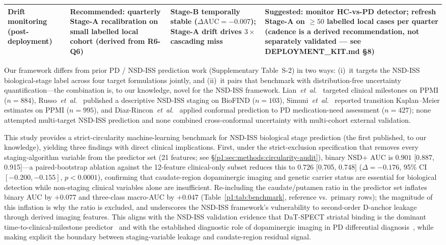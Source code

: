 \begin{table}[!t]
\begin{tabular}{@{}p{2.4cm}p{2.6cm}p{2.0cm}p{2.0cm}@{}}
\midrule
Drift monitoring (post-deployment) & Recommended: quarterly Stage-A recalibration on small labelled local cohort (derived from R6-Q6) & Stage-B temporally stable ($\Delta\mathrm{AUC} = -0.007$); Stage-A drift drives $3{\times}$ cascading miss & Suggested: monitor HC-vs-PD detector; refresh Stage-A on $\geq 50$ labelled local cases per quarter (cadence is a derived recommendation, not separately validated --- see DEPLOYMENT\_KIT.md §8) \\
\bottomrule
\end{tabular}
\end{table}

Our framework differs from prior PD / NSD-ISS prediction work (Supplementary Table~S-2) in two ways: (i)~it targets the NSD-ISS biological-stage label across four target formulations jointly, and (ii)~it pairs that benchmark with distribution-free uncertainty quantification---the combination is, to our knowledge, novel for the NSD-ISS framework. Lian~\textit{et~al.}~\cite{adamedgraph} targeted clinical milestones on PPMI ($n{=}884$), Russo~\textit{et~al.}~\cite{russo2025} published a descriptive NSD-ISS staging on BioFIND ($n{=}103$), Simuni~\textit{et~al.}~\cite{simuni2025} reported transition Kaplan--Meier estimates on PPMI ($n{=}995$), and Diaz-Rincon~\textit{et~al.}~\cite{diazrincon2025} applied conformal prediction to PD medication-need assessment ($n{=}427$); none attempted multi-target NSD-ISS prediction and none combined cross-conformal uncertainty with multi-cohort external validation.

This study provides a strict-circularity machine-learning benchmark for NSD-ISS biological stage prediction (the first published, to our knowledge), yielding three findings with direct clinical implications. First, under the strict-exclusion specification that removes every staging-algorithm variable from the predictor set (21 features; see \S\ref{p1:sec:methods:circularity-audit}), binary NSD$+$ AUC is $0.901$ [0.887, 0.915]---a paired-bootstrap ablation against the 12-feature clinical-only subset reduces this to $0.726$ [0.705, 0.748] ($\Delta{=}-0.176$, 95\% CI $[-0.200, -0.155]$, $p{<}0.0001$), confirming that caudate-region dopaminergic imaging and genetic carrier status are essential for biological detection while non-staging clinical variables alone are insufficient. Re-including the caudate/putamen ratio in the predictor set inflates binary AUC by $+0.077$ and three-class macro-AUC by $+0.047$ (Table~\ref{p1:tab:benchmark}, reference vs.\ primary rows); the magnitude of this inflation is why the ratio is excluded, and underscores the NSD-ISS framework's vulnerability to second-order D-anchor leakage through derived imaging features. This aligns with the NSD-ISS validation evidence that DaT-SPECT striatal binding is the dominant time-to-clinical-milestone predictor~\cite{simuni2024val} and with the established diagnostic role of dopaminergic imaging in PD differential diagnosis~\cite{seibyl2018dat}, while making explicit the boundary between staging-variable leakage and caudate-region residual signal.

